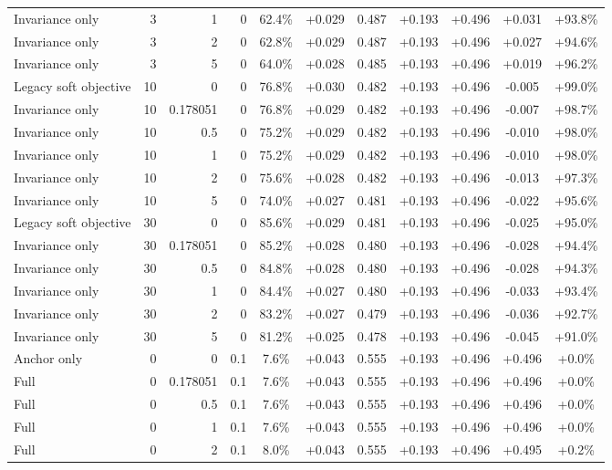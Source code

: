 \begin{table}[htbp]
\begin{tabular}{lrrrccccccc}
Invariance only & 3 & 1 & 0 & 62.4\% & +0.029 & 0.487 & +0.193 & +0.496 & +0.031 & +93.8\% \\
Invariance only & 3 & 2 & 0 & 62.8\% & +0.029 & 0.487 & +0.193 & +0.496 & +0.027 & +94.6\% \\
Invariance only & 3 & 5 & 0 & 64.0\% & +0.028 & 0.485 & +0.193 & +0.496 & +0.019 & +96.2\% \\
Legacy soft objective & 10 & 0 & 0 & 76.8\% & +0.030 & 0.482 & +0.193 & +0.496 & -0.005 & +99.0\% \\
Invariance only & 10 & 0.178051 & 0 & 76.8\% & +0.029 & 0.482 & +0.193 & +0.496 & -0.007 & +98.7\% \\
Invariance only & 10 & 0.5 & 0 & 75.2\% & +0.029 & 0.482 & +0.193 & +0.496 & -0.010 & +98.0\% \\
Invariance only & 10 & 1 & 0 & 75.2\% & +0.029 & 0.482 & +0.193 & +0.496 & -0.010 & +98.0\% \\
Invariance only & 10 & 2 & 0 & 75.6\% & +0.028 & 0.482 & +0.193 & +0.496 & -0.013 & +97.3\% \\
Invariance only & 10 & 5 & 0 & 74.0\% & +0.027 & 0.481 & +0.193 & +0.496 & -0.022 & +95.6\% \\
Legacy soft objective & 30 & 0 & 0 & 85.6\% & +0.029 & 0.481 & +0.193 & +0.496 & -0.025 & +95.0\% \\
Invariance only & 30 & 0.178051 & 0 & 85.2\% & +0.028 & 0.480 & +0.193 & +0.496 & -0.028 & +94.4\% \\
Invariance only & 30 & 0.5 & 0 & 84.8\% & +0.028 & 0.480 & +0.193 & +0.496 & -0.028 & +94.3\% \\
Invariance only & 30 & 1 & 0 & 84.4\% & +0.027 & 0.480 & +0.193 & +0.496 & -0.033 & +93.4\% \\
Invariance only & 30 & 2 & 0 & 83.2\% & +0.027 & 0.479 & +0.193 & +0.496 & -0.036 & +92.7\% \\
Invariance only & 30 & 5 & 0 & 81.2\% & +0.025 & 0.478 & +0.193 & +0.496 & -0.045 & +91.0\% \\
Anchor only & 0 & 0 & 0.1 & 7.6\% & +0.043 & 0.555 & +0.193 & +0.496 & +0.496 & +0.0\% \\
Full & 0 & 0.178051 & 0.1 & 7.6\% & +0.043 & 0.555 & +0.193 & +0.496 & +0.496 & +0.0\% \\
Full & 0 & 0.5 & 0.1 & 7.6\% & +0.043 & 0.555 & +0.193 & +0.496 & +0.496 & +0.0\% \\
Full & 0 & 1 & 0.1 & 7.6\% & +0.043 & 0.555 & +0.193 & +0.496 & +0.496 & +0.0\% \\
Full & 0 & 2 & 0.1 & 8.0\% & +0.043 & 0.555 & +0.193 & +0.496 & +0.495 & +0.2\% \\

\end{tabular}
\end{table}
